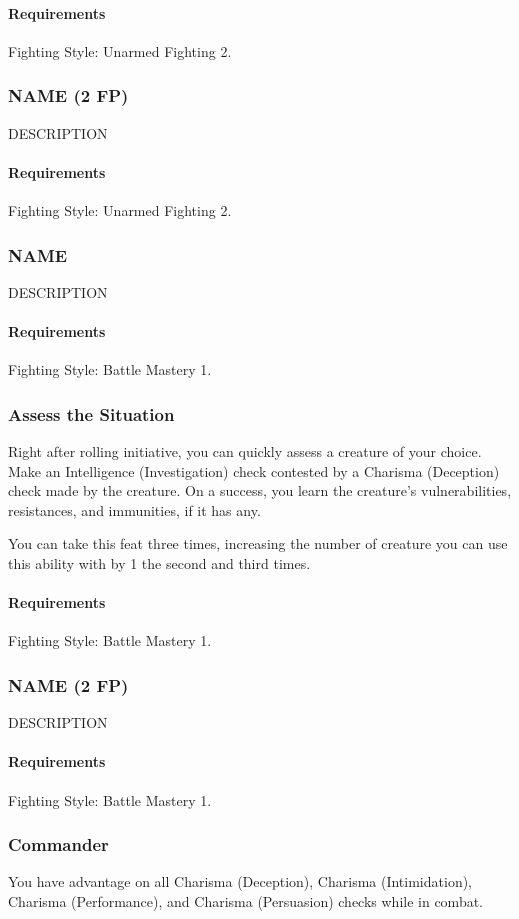     \paragraph{Requirements} Fighting Style: Unarmed Fighting 2.
\subsubsection{NAME (2 FP)} \label{feat::name}
    DESCRIPTION
    \paragraph{Requirements} Fighting Style: Unarmed Fighting 2.
\subsubsection{NAME} \label{feat::name}
    DESCRIPTION
    \paragraph{Requirements} Fighting Style: Battle Mastery 1.
\subsubsection{Assess the Situation} \label{feat::assessthesituation}
    Right after rolling initiative, you can quickly assess a creature of your choice.
    Make an Intelligence (Investigation) check contested by a Charisma (Deception) check made by the creature.
    On a success, you learn the creature's vulnerabilities, resistances, and immunities, if it has any.

    You can take this feat three times, increasing the number of creature you can use this ability with by 1 the second and third times.
    \paragraph{Requirements} Fighting Style: Battle Mastery 1.
\subsubsection{NAME (2 FP)} \label{feat::name}
    DESCRIPTION
    \paragraph{Requirements} Fighting Style: Battle Mastery 1.
\subsubsection{Commander} \label{feat::commander}
    You have advantage on all Charisma (Deception), Charisma (Intimidation), Charisma (Performance), and Charisma (Persuasion) checks while in combat.
